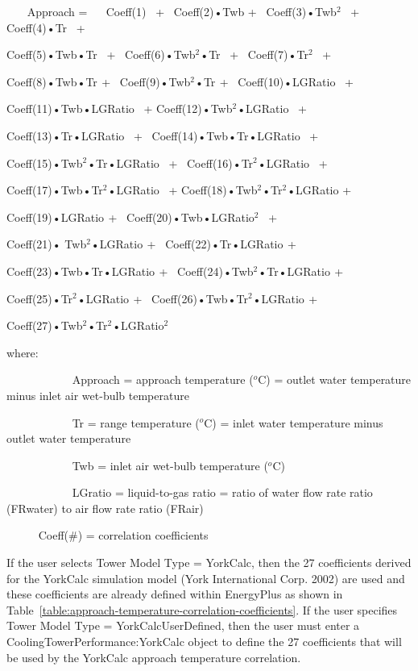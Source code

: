 ~~~ Approach = ~~ Coeff(1)~ +~ Coeff(2)•Twb +~ Coeff(3)•Twb\(^{2}\)~ +~ Coeff(4)•Tr~ +

Coeff(5)•Twb•Tr~ +~ Coeff(6)•Twb\(^{2}\)•Tr~ +~ Coeff(7)•Tr\(^{2}\)~ +

Coeff(8)•Twb•Tr\(^{ }\) +~ Coeff(9)•Twb\(^{2}\)•Tr\(^{ }\) +~ Coeff(10)•LGRatio~ +

Coeff(11)•Twb•LGRatio~ + Coeff(12)•Twb\(^{2}\)•LGRatio~ +

Coeff(13)•Tr•LGRatio~ +~ Coeff(14)•Twb•Tr•LGRatio~ +

Coeff(15)•Twb\(^{2}\)•Tr•LGRatio~ +~ Coeff(16)•Tr\(^{2}\)•LGRatio~ +

Coeff(17)•Twb•Tr\(^{2}\)•LGRatio~ + Coeff(18)•Twb\(^{2}\)•Tr\(^{2}\)•LGRatio +

Coeff(19)•LGRatio\(^{ }\) +~ Coeff(20)•Twb•LGRatio\(^{2}\)~ +

Coeff(21)• Twb\(^{2}\)•LGRatio\(^{ }\) +~ Coeff(22)•Tr•LGRatio\(^{ }\) +

Coeff(23)•Twb•Tr•LGRatio\(^{ }\) +~ Coeff(24)•Twb\(^{2}\)•Tr•LGRatio\(^{ }\) +

Coeff(25)•Tr\(^{2}\)•LGRatio\(^{ }\) +~ Coeff(26)•Twb•Tr\(^{2}\)•LGRatio\(^{ }\) +

Coeff(27)•Twb\(^{2}\)•Tr\(^{2}\)•LGRatio\(^{2}\)

where:

~~~~~~~~~~~ Approach = approach temperature (\(^{o}\)C) = outlet water temperature minus inlet air wet-bulb temperature

~~~~~~~~~~~ Tr = range temperature (\(^{o}\)C) = inlet water temperature minus outlet water temperature

~~~~~~~~~~~ Twb = inlet air wet-bulb temperature (\(^{o}\)C)

~~~~~~~~~~~ LGratio = liquid-to-gas ratio = ratio of water flow rate ratio (FRwater) to air flow rate ratio (FRair)

~~~~~ Coeff(\#) = correlation coefficients

If the user selects Tower Model Type = YorkCalc, then the 27 coefficients derived for the YorkCalc simulation model (York International Corp. 2002) are used and these coefficients are already defined within EnergyPlus as shown in Table~\ref{table:approach-temperature-correlation-coefficients}. If the user specifies Tower Model Type = YorkCalcUserDefined, then the user must enter a CoolingTowerPerformance:YorkCalc object to define the 27 coefficients that will be used by the YorkCalc approach temperature correlation.


